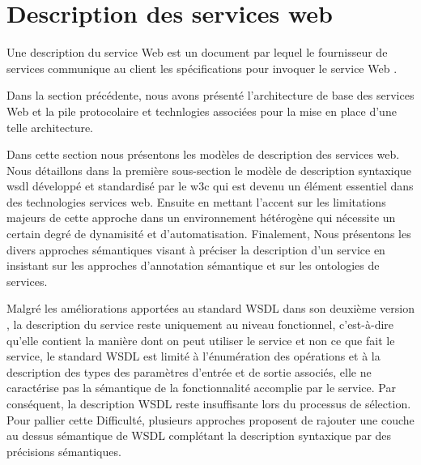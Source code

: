  \newpage

\section{Description des services web}
\label{sec:ws-description}


Une description du service Web est un document par lequel le
fournisseur de services communique au client les spécifications pour
invoquer le service Web \cite{lopez2008selection}.

Dans la section précédente, nous avons présenté l'architecture de base
des services Web et la pile protocolaire et technlogies associées pour
la mise en place d'une telle architecture.

Dans cette section nous présentons les modèles de description des
services web. Nous détaillons dans la première sous-section le modèle
de description syntaxique \acrshort{wsdl} \cite{chinnici2007web}
développé et standardisé par le \acrshort{w3c} qui est devenu un
élément essentiel dans des technologies services web. Ensuite en
mettant l'accent sur les limitations majeurs de cette approche dans un
environnement hétérogène qui nécessite un certain degré de dynamisité
et d'automatisation.  Finalement, Nous présentons les divers approches
sémantiques visant à préciser la description d'un service en insistant
sur les approches d'annotation sémantique et sur les ontologies de
services.

Malgré les améliorations apportées au standard \textsc{WSDL} dans son
deuxième version \cite{chinnici2007web}, la description du service
reste uniquement au niveau fonctionnel, c'est-à-dire qu'elle contient
la manière dont on peut utiliser le service et non ce que fait le
service, le standard \textsc{WSDL} est limité à l'énumération des
opérations et à la description des types des paramètres d'entrée et de
sortie associés, elle ne caractérise pas la sémantique de la
fonctionnalité accomplie par le service. Par conséquent, la
description \textsc{WSDL} reste insuffisante lors du processus de
sélection.  Pour pallier cette Difficulté, plusieurs approches
proposent de rajouter une couche au dessus sémantique de \textsc{WSDL}
complétant la description syntaxique par
des précisions sémantiques.\\


